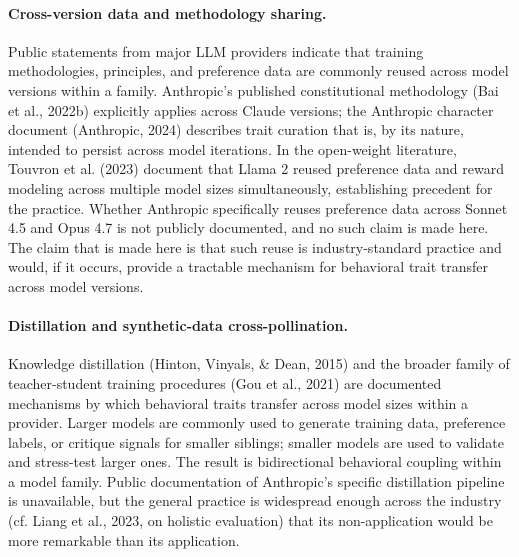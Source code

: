 \documentclass[11pt]{article}
\begin{document}
\paragraph{Cross-version data and methodology sharing.} Public statements from major LLM providers indicate that training methodologies, principles, and preference data are commonly reused across model versions within a family. Anthropic's published constitutional methodology (Bai et al., 2022b) explicitly applies across Claude versions; the Anthropic character document (Anthropic, 2024) describes trait curation that is, by its nature, intended to persist across model iterations. In the open-weight literature, Touvron et al. (2023) document that Llama 2 reused preference data and reward modeling across multiple model sizes simultaneously, establishing precedent for the practice. Whether Anthropic specifically reuses preference data across Sonnet 4.5 and Opus 4.7 is not publicly documented, and no such claim is made here. The claim that is made here is that such reuse is industry-standard practice and would, if it occurs, provide a tractable mechanism for behavioral trait transfer across model versions.

\paragraph{Distillation and synthetic-data cross-pollination.} Knowledge distillation (Hinton, Vinyals, \& Dean, 2015) and the broader family of teacher-student training procedures (Gou et al., 2021) are documented mechanisms by which behavioral traits transfer across model sizes within a provider. Larger models are commonly used to generate training data, preference labels, or critique signals for smaller siblings; smaller models are used to validate and stress-test larger ones. The result is bidirectional behavioral coupling within a model family. Public documentation of Anthropic's specific distillation pipeline is unavailable, but the general practice is widespread enough across the industry (cf. Liang et al., 2023, on holistic evaluation) that its non-application would be more remarkable than its application.
\end{document}

